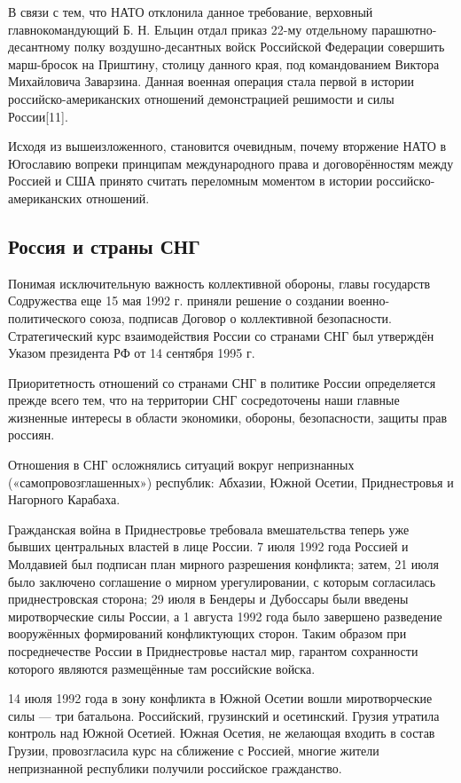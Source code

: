 В связи с тем, что НАТО отклонила данное требование, верховный главнокомандующий Б. Н. Ельцин отдал приказ 22-му отдельному парашютно-десантному полку воздушно-десантных войск Российской Федерации совершить марш-бросок на Приштину, столицу данного края, под командованием Виктора Михайловича Заварзина. Данная военная операция стала первой в истории российско-американских отношений демонстрацией решимости и силы России[11].

Исходя из вышеизложенного, становится очевидным, почему вторжение НАТО в Югославию вопреки принципам международного права и договорённостям между Россией и США принято считать переломным моментом в истории российско-американских отношений.
\subsection{Россия и страны СНГ}
Понимая исключительную важность коллективной обороны, главы государств Содружества еще 15 мая 1992 г. приняли решение о создании военно-политического союза, подписав Договор о коллективной безопасности. Стратегический курс взаимодействия России со странами СНГ был утверждён Указом президента РФ от 14 сентября 1995 г.

Приоритетность отношений со странами СНГ в политике России определяется прежде всего тем, что на территории СНГ сосредоточены наши главные жизненные интересы в области экономики, обороны, безопасности, защиты прав россиян.

Отношения в СНГ осложнялись ситуаций вокруг непризнанных («самопровозглашенных») республик: Абхазии, Южной Осетии, Приднестровья и Нагорного Карабаха.

Гражданская война в Приднестровье требовала вмешательства теперь уже бывших центральных властей в лице России. 7 июля 1992 года Россией и Молдавией был подписан план мирного разрешения конфликта; затем, 21 июля было заключено соглашение о мирном урегулировании, с которым согласилась приднестровская сторона; 29 июля в Бендеры и Дубоссары были введены миротворческие силы России, а 1 августа 1992 года было завершено разведение вооружённых формирований конфликтующих сторон. Таким образом при посреднечестве России в Приднестровье настал мир, гарантом сохранности которого являются размещённые там российские войска.

14 июля 1992 года в зону конфликта в Южной Осетии вошли миротворческие силы — три батальона. Российский, грузинский и осетинский. Грузия утратила контроль над Южной Осетией. Южная Осетия, не желающая входить в состав Грузии, провозгласила курс на сближение с Россией, многие жители непризнанной республики получили российское гражданство.
